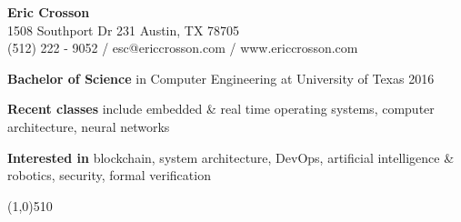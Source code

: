 \documentclass{report}
\newcommand{\cut}{\begin{center} \line(1,0){510} \end{center}}
\begin{document}
\pagestyle{empty}
\setlength\parindent{0pt}

\begin{center}
  \textbf{Eric Crosson} \\
  1508 Southport Dr 231 Austin, TX 78705 \\
  (512) 222 - 9052 / esc@ericcrosson.com / www.ericcrosson.com
\end{center}

\textbf{Bachelor of Science} in Computer Engineering at University of Texas
2016

\vspace{1mm}

\textbf{Recent classes} include embedded \& real time operating systems,
computer architecture, neural networks

\vspace{1mm}

\textbf{Interested in} blockchain, system architecture, DevOps, artificial intelligence \& robotics, security, formal verification

\cut{}
\end{document}

